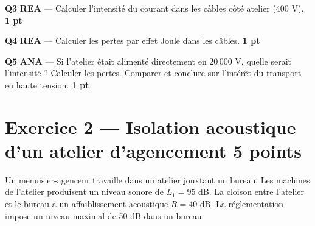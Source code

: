 \documentclass[a4paper,11pt]{article}
\newcommand{\pts}[1]{\hfill\textcolor{gris}{\small\textbf{#1}}}
\newcommand{\comp}[1]{\colorbox{blue!10}{\scriptsize\textbf{#1}}}
\begin{document}
\textbf{Q3} \comp{REA} — Calculer l'intensité du courant dans les câbles côté atelier (400 V). \pts{1 pt}

\begin{reponsebox}[3cm]
\dotfill

\dotfill

\dotfill
\end{reponsebox}

\textbf{Q4} \comp{REA} — Calculer les pertes par effet Joule dans les câbles. \pts{1 pt}

\begin{reponsebox}[3cm]
\dotfill

\dotfill

\dotfill
\end{reponsebox}

\textbf{Q5} \comp{ANA} — Si l'atelier était alimenté directement en 20\,000 V, quelle serait l'intensité ? Calculer les pertes. Comparer et conclure sur l'intérêt du transport en haute tension. \pts{1 pt}

\begin{reponsebox}[5cm]
\dotfill

\dotfill

\dotfill

\dotfill

\dotfill
\end{reponsebox}

\newpage

\section*{Exercice 2 — Isolation acoustique d'un atelier d'agencement \pts{5 points}}

\begin{contextebox}
Un menuisier-agenceur travaille dans un atelier jouxtant un bureau. Les machines de l'atelier produisent un niveau sonore de $L_1 = 95$ dB. La cloison entre l'atelier et le bureau a un affaiblissement acoustique $R = 40$ dB. La réglementation impose un niveau maximal de 50 dB dans un bureau.
\end{contextebox}
\end{document}
